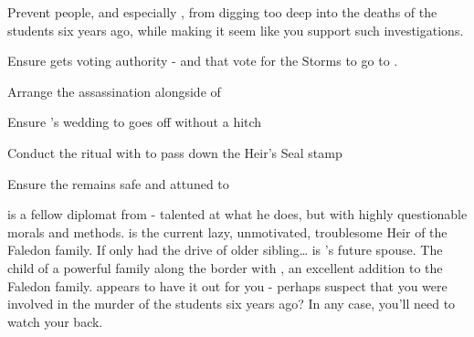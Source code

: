 \documentclass[char]{GL2020}
\begin{document}
\begin{itemz}[Goals]
	\item Prevent people, and especially \cHeir{}, from digging too deep into the deaths of the students six years ago, while making it seem like you support such investigations.
	\item Ensure \cHeir{} gets voting authority - and that \cHeir{\they} vote\cHeir{\plural} for the Storms to go to \pShip{}.
	\item Arrange the assassination \cLoud{} alongside of \cEvil{}
	\item Ensure \cHeir{}’s wedding to \cChupStudent{} goes off without a hitch
	\item Conduct the ritual with \cHeir{} to pass down the Heir’s Seal stamp
	\item Ensure the \iMirror{} remains safe and attuned to \pTech{} 
\end{itemz}

\begin{itemz}[Notes]
	\item 
\end{itemz}

\begin{contacts}
	\contact{\cEvil{}} is a fellow diplomat from \pFarm{} - talented at what he does, but with highly questionable morals and methods.
\contact{\cHeir{}} is the current lazy, unmotivated, troublesome Heir of the Faledon family. If only \cHeir{\they} had the drive of \cHeir{\their} older sibling\ldots
\contact{\cChupStudent{}} is \cHeir{}’s future spouse. The child of a powerful \pFarm{} family along the border with \pTech{}, \cChupStudent{\they} \cChupStudent{\are} an excellent addition to the Faledon family.
\contact{\cChupAvenger{}} appears to have it out for you - perhaps \cChupAvenger{\they} suspect\cChupAvenger{\plural} that you were involved in the murder of the students six years ago?  In any case, you’ll need to watch your back.

\end{contacts}
\end{document}
